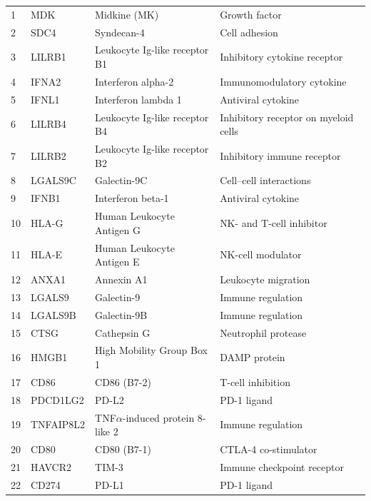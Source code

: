 \begin{longtable}{|p{1cm}|p{2.5cm}|p{4cm}|p{4cm}|}
	1  & MDK       & Midkine (MK)                         & Growth factor \\
	2  & SDC4      & Syndecan-4                           & Cell adhesion \\
	3  & LILRB1    & Leukocyte Ig-like receptor B1        & Inhibitory cytokine receptor \\
	4  & IFNA2     & Interferon alpha-2                   & Immunomodulatory cytokine \\
	5  & IFNL1     & Interferon lambda 1                  & Antiviral cytokine \\
	6  & LILRB4    & Leukocyte Ig-like receptor B4        & Inhibitory receptor on myeloid cells \\
	7  & LILRB2    & Leukocyte Ig-like receptor B2        & Inhibitory immune receptor \\
	8  & LGALS9C   & Galectin-9C                          & Cell--cell interactions \\
	9  & IFNB1     & Interferon beta-1                    & Antiviral cytokine \\
	10 & HLA-G     & Human Leukocyte Antigen G            & NK- and T-cell inhibitor \\
	11 & HLA-E     & Human Leukocyte Antigen E            & NK-cell modulator \\
	12 & ANXA1     & Annexin A1                           & Leukocyte migration \\
	13 & LGALS9    & Galectin-9                           & Immune regulation \\
	14 & LGALS9B   & Galectin-9B                          & Immune regulation \\
	15 & CTSG      & Cathepsin G                          & Neutrophil protease \\
	16 & HMGB1     & High Mobility Group Box 1            & DAMP protein \\
	17 & CD86      & CD86 (B7-2)                          & T-cell inhibition \\
	18 & PDCD1LG2  & PD-L2                                & PD-1 ligand \\
	19 & TNFAIP8L2 & TNF$\alpha$-induced protein 8-like 2 & Immune regulation \\
	20 & CD80      & CD80 (B7-1)                          & CTLA-4 co-stimulator \\
	21 & HAVCR2    & TIM-3                                & Immune checkpoint receptor \\
	22 & CD274     & PD-L1                                & PD-1 ligand \\

\end{longtable}
